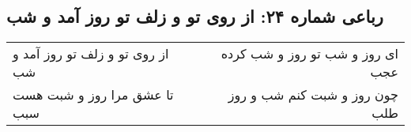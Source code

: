 \begin{center}
\section*{رباعی شماره ۲۴: از روی تو و زلف تو روز آمد و شب}
\label{sec:sh024}
\begin{longtable}{l p{0.5cm} r}
از روی تو و زلف تو روز آمد و شب
&&
ای روز و شب تو روز و شب کرده عجب
\\
تا عشق مرا روز و شبت هست سبب
&&
چون روز و شبت کنم شب و روز طلب
\\
\end{longtable}
\end{center}
